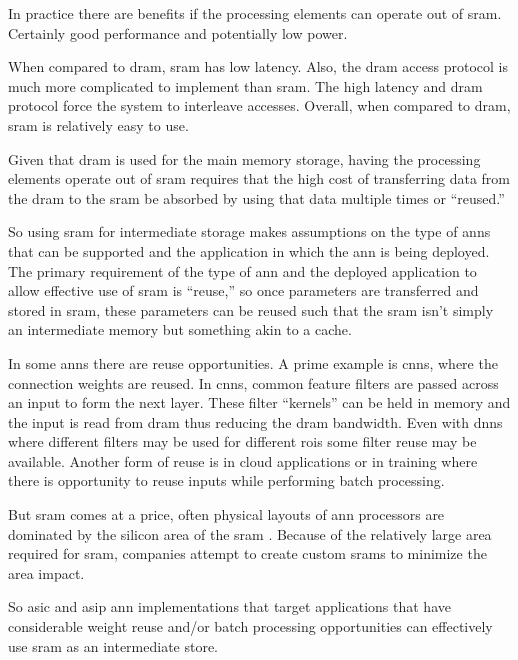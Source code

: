 In practice there are benefits if the processing elements can operate out of \ac{sram}.
Certainly good performance and potentially low power. 

When compared to \ac{dram}, \ac{sram} has low latency. Also, the \ac{dram} access protocol is much more complicated to implement than \ac{sram}. 
The high latency and \ac{dram} protocol force the system to interleave accesses. Overall, when compared to \ac{dram}, \ac{sram} is relatively easy to use.

Given that \ac{dram} is used for the main memory storage, having the processing elements operate out of \ac{sram} requires that the high cost of transferring data from the \ac{dram} to the \ac{sram} be absorbed by using that data multiple times or ``reused.''

So using \ac{sram} for intermediate storage makes assumptions on the type of \acp{ann} that can be supported and the application in which the \ac{ann} is being deployed.
The primary requirement of the type of \ac{ann} and the deployed application to allow effective use of \ac{sram} is ``reuse,'' so once parameters are transferred and stored in \ac{sram}, these parameters can be reused such that the \ac{sram} isn't simply an intermediate memory but something akin to a cache.

In some \ac{ann}s there are reuse opportunities. 
A prime example is \acp{cnn}, where the connection weights are reused. In \acp{cnn}, common feature filters are passed across an input to form the next layer. 
These filter ``kernels'' can be held in memory and the input is read from \ac{dram} thus reducing the \ac{dram} bandwidth.
Even with \ac{dnn}s where different filters may be used for different \acp{roi} some filter reuse may be available.
Another form of reuse is in cloud applications or in training where there is opportunity to reuse inputs while performing batch processing.

But \ac{sram} comes at a price, often physical layouts of \ac{ann} processors are dominated by the silicon area of the \ac{sram} \cite{kim2016neurocube}\cite{chen2014diannao}\cite{tensorflow2015-whitepaper}. 
Because of the relatively large area required for \ac{sram}, companies attempt to create custom \acp{sram} to minimize the area impact.

So \ac{asic} and \ac{asip} \ac{ann} implementations that target applications that have considerable weight reuse and/or batch processing opportunities can effectively use \ac{sram} as an intermediate store.

